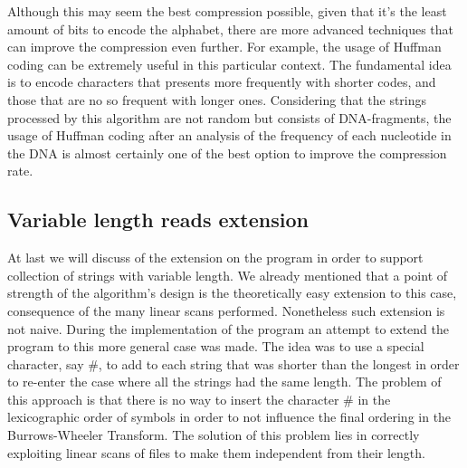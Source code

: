 \documentclass[a4paper,12pt, oneside]{article}
\begin{document}
Although this may seem the best compression possible, given that it's the least amount of bits to encode the alphabet, there are more advanced techniques that can improve the compression even further. For example, the usage of Huffman coding \cite{huffman} can be extremely useful in this particular context. The fundamental idea is to encode characters that presents more frequently with shorter codes, and those that are no so frequent with longer ones. Considering that the strings processed by this algorithm are not random but consists of DNA-fragments, the usage of Huffman coding after an analysis of the frequency of each nucleotide in the DNA is almost certainly one of the best option to improve the compression rate. 

\newpage
\subsection{Variable length reads extension}

At last we will discuss of the extension on the program in order to support collection of strings with variable length. We already mentioned that a point of strength of the algorithm's design is the theoretically easy extension to this case, consequence of the many linear scans performed. Nonetheless such extension is not naive. During the implementation of the program an attempt to extend the program to this more general case was made. The idea was to use a special character, say \#, to add to each string that was shorter than the longest in order to re-enter the case where all the strings had the same length. The problem of this approach is that there is no way to insert the character \# in the lexicographic order of symbols in order to not influence the final ordering in the Burrows-Wheeler Transform. The solution of this problem lies in correctly exploiting linear scans of files to make them independent from their length.
\end{document}
